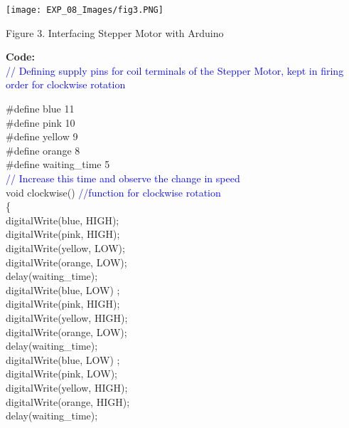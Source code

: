 \documentclass[12pt,a4paper]{article}
\begin{document}
\begin{center} 
\texttt{[image: EXP\_08\_Images/fig3.PNG]}
\end{center}

\begin{center} {Figure 3. Interfacing Stepper Motor with Arduino}\end{center}

\hspace{2cm}\textbf{\large Code:}\\[6pt]

\textcolor{blue}{// Defining supply pins for coil terminals of the Stepper Motor, kept in firing order for clockwise rotation}

\setlength{\parindent}{10eM}

\#define blue     11\\
\#define pink     10\\           
\#define yellow   9\\                        
\#define orange   8\\
\#define waiting\_time 5\\[3pt]

\textcolor{blue}{// Increase this time and observe the change in speed}\\[3pt]

 void clockwise() \hspace{12pt}\textcolor{blue}{//function for clockwise rotation\\}
 \{ \\       
  digitalWrite(blue, HIGH);\\
  digitalWrite(pink, HIGH);\\
  digitalWrite(yellow, LOW);\\
  digitalWrite(orange, LOW);\\
  delay(waiting\_time);\\[3pt]

  digitalWrite(blue, LOW) ;\\
  digitalWrite(pink, HIGH);\\
  digitalWrite(yellow, HIGH);\\
  digitalWrite(orange, LOW);\\
  delay(waiting\_time);\\[3pt]

  digitalWrite(blue, LOW) ;\\
  digitalWrite(pink, LOW);\\
  digitalWrite(yellow, HIGH);\\
  digitalWrite(orange, HIGH);\\
  delay(waiting\_time);\\[3pt]
\end{document}
